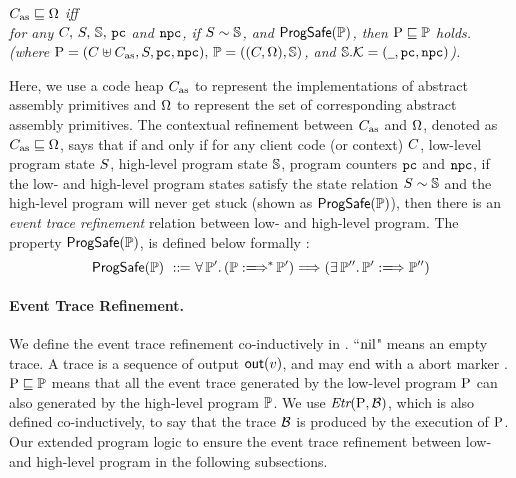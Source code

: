 \begin{definition}
    \em
    \label{def:prim-correctness}
    $C_{\text{as}} \sqsubseteq \Omega$ iff  \\
    for any $C, \, S, \, \mathbb{S}, \, \texttt{pc}$ and $\texttt{npc}$, if 
    ${S} \sim {\mathbb{S}}$, and $\textsf{ProgSafe}(\mathbb{P})$, 
    then $\text{P} \sqsubseteq \mathbb{P}$ holds. 
    (where $\text{P} = (C \uplus C_{\text{as}}, S, \texttt{pc}, \texttt{npc}), \, 
        \mathbb{P} = ((C, \Omega), \mathbb{S})$, and 
        $\mathbb{S}.\mathcal{K} = (\underline{\ \,}, \texttt{pc}, \texttt{npc})$).  
\end{definition}

Here, we use a code heap $C_{\text{as}}$
to represent the implementations of abstract 
assembly primitives and $\Omega$ to represent the set of corresponding 
abstract assembly primitives. The contextual refinement between 
$C_{\text{as}}$ and $\Omega$, denoted as $C_{\text{as}} \sqsubseteq \Omega$, 
says that if and only if for any client code 
(or context) $C$, low-level program 
state $S$, high-level program state $\mathbb{S}$, program counters 
$\texttt{pc}$ and $\texttt{npc}$, if the low- and high-level program states satisfy the 
state relation ${S} \sim {\mathbb{S}}$ and the high-level program 
will never get stuck (shown as $\textsf{ProgSafe}(\mathbb{P})$), 
then there is an {\it event trace refinement} relation 
between low- and high-level program. The property $\textsf{ProgSafe}(\mathbb{P})$, 
is defined below formally : 
\[
    \progsafe(\HProg) \ \define \ 
    \forall \, \HProg'. \, 
    (\HGlobMultiTrans{\HProg}{}{*}{\HProg'}) 
    \Longrightarrow 
    (\exists \, \HProg''. \, 
        \HGlobTrans{\HProg'}{}{\HProg''})
\]

\paragraph{\textbf{Event Trace Refinement.}}
We define the event trace refinement co-inductively 
in \Fig{\ref{fig:event-trace-refinement}}. ``$\text{nil}$" means 
an empty trace. A trace is a sequence of output $\textsf{out}({v})$, 
and may end with a abort marker \evtabort{}. 
$\text{P} \sqsubseteq \mathbb{P}$ means that all the event trace 
generated by the low-level program $\text{P}$ can also 
generated by the high-level program $\mathbb{P}$. 
We use $\textit{Etr}{(\text{P}, \mathcal{B})}$, which is also defined 
co-inductively, to say that the trace 
$\mathcal{B}$ is produced by the execution of $\text{P}$. 
Our extended program logic to ensure 
the event trace refinement between low- and high-level 
program in the following subsections. 

